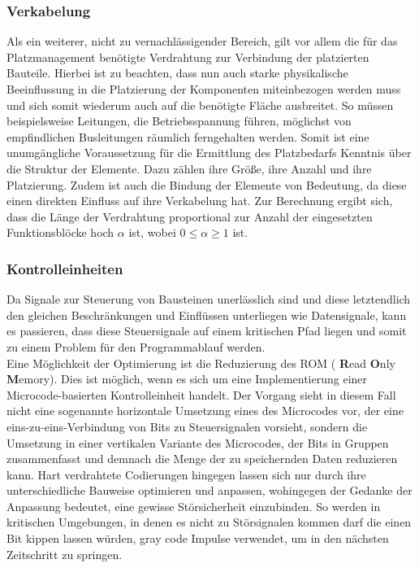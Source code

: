 \documentclass[conference]{IEEEtran}
\begin{document}
 \subsubsection{Verkabelung}
 Als ein weiterer, nicht zu vernachlässigender Bereich, gilt vor allem die für das Platzmanagement benötigte Verdrahtung zur Verbindung der platzierten Bauteile. Hierbei ist zu beachten, dass nun auch starke physikalische Beeinflussung in die Platzierung der Komponenten miteinbezogen werden muss und sich somit wiederum auch auf die benötigte Fläche ausbreitet. So müssen beispielsweise Leitungen, die Betriebsspannung führen, möglichst von empfindlichen Busleitungen räumlich ferngehalten werden.
Somit ist eine unumgängliche Voraussetzung für die Ermittlung des Platzbedarfs Kenntnis über die Struktur der Elemente. Dazu zählen ihre Größe, ihre Anzahl und ihre Platzierung. Zudem ist auch die Bindung der Elemente von Bedeutung, da diese einen direkten Einfluss auf ihre Verkabelung hat.\cite[S.157]{3}
Zur Berechnung ergibt sich, dass die Länge der Verdrahtung proportional zur Anzahl der eingesetzten Funktionsblöcke hoch $\alpha$ ist, wobei $0 \leq \alpha \geq 1$ ist.\cite[S.157]{3}\\
 \subsubsection{Kontrolleinheiten}
Da Signale zur Steuerung von Bausteinen unerlässlich sind und diese letztendlich den gleichen Beschränkungen und Einflüssen unterliegen wie Datensignale, kann es passieren, dass diese Steuersignale auf einem kritischen Pfad liegen und somit zu einem Problem für den Programmablauf werden.\\
Eine Möglichkeit der Optimierung ist die Reduzierung des ROM ( \textbf{R}ead \textbf{O}nly \textbf{M}emory). Dies ist möglich, wenn es sich um eine Implementierung einer Microcode-basierten Kontrolleinheit handelt. Der Vorgang sieht in diesem Fall nicht eine sogenannte horizontale Umsetzung eines des Microcodes vor, der eine eins-zu-eins-Verbindung von Bits zu Steuersignalen vorsieht, sondern die Umsetzung in einer vertikalen Variante des Microcodes, der Bits in Gruppen zusammenfasst und demnach die Menge der zu speichernden Daten reduzieren kann.
\cite[S.371-372]{2}
Hart verdrahtete Codierungen hingegen lassen sich nur durch ihre unterschiedliche Bauweise optimieren und anpassen, wohingegen der Gedanke der Anpassung bedeutet, eine gewisse Störsicherheit einzubinden. So werden in kritischen Umgebungen, in denen es nicht zu Störsignalen kommen darf die einen Bit kippen lassen würden, gray code Impulse verwendet, um in den nächsten Zeitschritt zu springen.\cite[S.373]{2}
\end{document}
